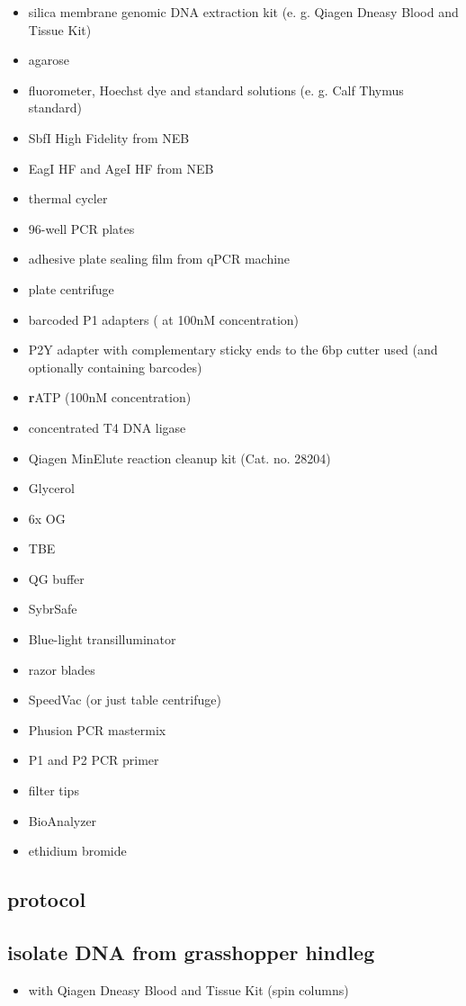 {\small
\begin{itemize}
\item silica membrane genomic DNA extraction kit (e. g. Qiagen Dneasy Blood and Tissue Kit)
\item agarose
\item fluorometer, Hoechst dye and standard solutions (e. g. Calf Thymus standard)
\item SbfI High Fidelity from NEB
\item EagI HF and AgeI HF from NEB
\item thermal cycler
\item 96-well PCR plates
\item adhesive plate sealing film from qPCR machine
\item plate centrifuge
\item barcoded P1 adapters ( at 100nM concentration)
\item P2Y adapter with complementary sticky ends to the 6bp cutter used (and optionally containing barcodes)
\item \textbf{r}ATP (100nM concentration)
\item concentrated T4 DNA ligase
\item Qiagen MinElute reaction cleanup kit (Cat. no. 28204)
\item Glycerol
\item 6x OG
\item TBE
\item QG buffer
\item SybrSafe
\item Blue-light transilluminator
\item razor blades
\item SpeedVac (or just table centrifuge)
\item Phusion PCR mastermix
\item P1 and P2 PCR primer
\item filter tips
\item BioAnalyzer
\item ethidium bromide
\end{itemize}
}

%
%
\subsection{protocol}
%
%

\subsection{isolate DNA from grasshopper hindleg}
\begin{itemize}
\item with Qiagen Dneasy Blood and Tissue Kit (spin columns)
\end{itemize}

